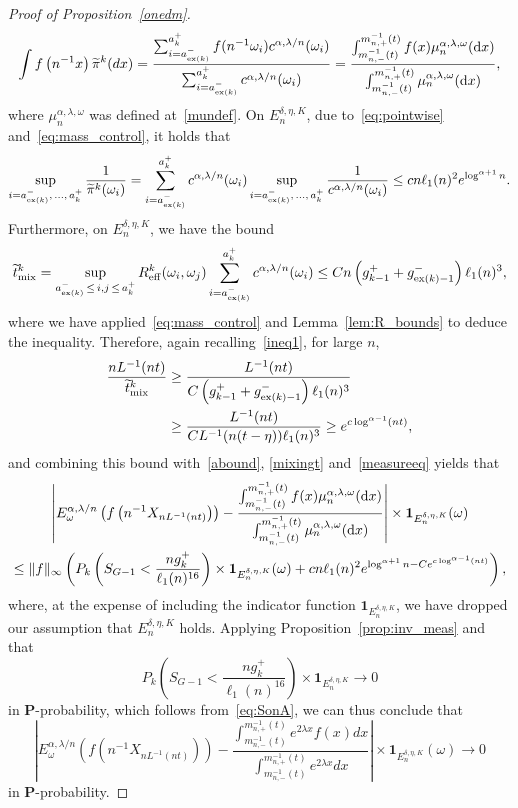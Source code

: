 \documentclass[AHL,Unicode,longabstracts,published]{cedram}
\newcommand{\bfP}{\mathbf{P}}
\newcommand{\bfun}{\mathbf{1}}
\newcommand{\mix}{\mathrm{mix}}
\newcommand{\eff}{\mathrm{eff}}
\newcommand{\dd}{\text{\upshape{d}}}
\newcommand\ex{\operatorname{ex}}
\newcommand{\aat}[1]{a_{\ex(#1)}^-}
\newcommand{\gtt}[1]{g_{\ex(#1)-1}^-}
\newcommand{\B}{{16}}
\let\oldtilde\tilde
\renewcommand*{\tilde}[1]{\mathchoice{\widetilde{#1}}{\widetilde{#1}}{\oldtilde{#1}}{\oldtilde{#1}}}
\begin{document}
\begin{proof}[Proof of Proposition~\ref{onedm}]
\begin{equation}
\int f\left(n^{-1}x\right)\tilde{\pi}^k(dx)=\frac{\sum_{i=\aat{k}}^{a_k^+}f(n^{-1}\omega_i)c^{\alpha,\lambda/n}(\omega_i)}{\sum_{i=\aat{k}}^{a_k^+}c^{\alpha,\lambda/n}(\omega_i)}=\frac{ \int_{m_{n,-}^{-1}(t)}^{m_{n,+}^{-1}(t)}f(x)\mu_n^{\alpha,\lambda,\omega}(\dd x)}{ \int_{m_{n,-}^{-1}(t)}^{m_{n,+}^{-1}(t)}\mu_n^{\alpha,\lambda,\omega}(\dd x)},
\end{equation}
where $\mu_n^{\alpha,\lambda,\omega}$ was defined at~\eqref{mundef}. On $E_n^{\delta,\eta,K}$, due to~\eqref{eq:pointwise} and~\eqref{eq:mass_control}, it holds that
\begin{align*}
\sup_{i=\aat{k},\,\dots,\,a_k^+} \frac{1}{\tilde \pi^k(\omega_i)}=\sum_{i=\aat{k}}^{a_k^+}c^{\alpha,\lambda/n}(\omega_i)\sup_{i=\aat{k},\,\dots,\,a_k^+}\frac{1}{c^{\alpha,\lambda/n}(\omega_i)}\leq c n\ell_1(n)^2 e^{\log^{\alpha+1}n}.
\end{align*}
Furthermore, on $E_n^{\delta,\eta,K}$, we have the bound
\[
\tilde{t}^k_{\mix}= \sup_{\aat{k}\,\leq \,i,j\,\leq\,a_k^+}R_\eff^k(\omega_i,\omega_j) \sum_{i=\aat{k}}^{a_k^+}c^{\alpha,\lambda/n}(\omega_i)\leq C n\left(g_{k-1}^++\gtt{k}\right)\ell_1(n)^3,
\]
where we have applied~\eqref{eq:mass_control} and Lemma~\ref{lem:R_bounds} to deduce the inequality. Therefore, again recalling~\eqref{ineq1}, for large $n$,
\begin{equation}\label{ggg}
\begin{split}
\frac{nL^{-1}(nt)}{\tilde{t}^k_{\mix}}&\geq \frac{L^{-1}(nt)}{C\left(g_{k-1}^++\gtt{k}\right)\ell_1(n)^3}\\
&\geq\frac{L^{-1}(nt)}{CL^{-1}(n(t-\eta))\ell_1(n)^3}\geq e^{c\log^{\alpha-1} (nt)},
\end{split}
\end{equation}
and combining this bound with~\eqref{abound}, \eqref{mixingt} and~\eqref{measureeq} yields that
\begin{multline*}
\left|{E}^{\alpha,\lambda/n}_\omega\left(f\left(n^{-1}{X}_{nL^{-1}(nt)}\right)\right)-\frac{ \int_{m_{n,-}^{-1}(t)}^{m_{n,+}^{-1}(t)}f(x)\mu_n^{\alpha,\lambda,\omega}(\dd x)}{ \int_{m_{n,-}^{-1}(t)}^{m_{n,+}^{-1}(t)}\mu_n^{\alpha,\lambda,\omega}(\dd x)}\right|\times\bfun_{E_n^{\delta,\eta,K}}(\omega)\\
\leq\|f\|_\infty\left({P}_k\left(S_{G-1}<\frac{ng_k^+}{\ell_1(n)^{\B}}\right)\times\bfun_{E_n^{\delta,\eta,K}}(\omega)+ c n\ell_1(n)^2 e^{\log^{\alpha+1}n-Ce^{c\log^{\alpha-1} (nt)}}\right),
\end{multline*}
where, at the expense of including the indicator function $\bfun_{E_n^{\delta,\eta,K}}$, we have dropped our assumption that $E_n^{\delta,\eta,K}$ holds. Applying Proposition~\ref{prop:inv_meas} and that
\[
{P}_k\left(S_{G-1}<\frac{ng_k^+}{\ell_1(n)^{\B}}\right)\times\bfun_{E_n^{\delta,\eta,K}}\rightarrow 0
\]
in $\bfP$-probability, which follows from~\eqref{eq:SonA}, we can thus conclude that
\[
\left|{E}^{\alpha,\lambda/n}_\omega\left(f\left(n^{-1}{X}_{nL^{-1}(nt)}\right)\right)-
\frac{\int_{m_{n,-}^{-1}(t)}^{m_{n,+}^{-1}(t)}e^{2\lambda x}f(x)dx}{\int_{m_{n,-}^{-1}(t)}^{m_{n,+}^{-1}(t)}e^{2\lambda x}dx}\right|\times\bfun_{E_n^{\delta,\eta,K}}(\omega)\rightarrow0
\]
in $\bfP$-probability.


\end{proof}
\end{document}
